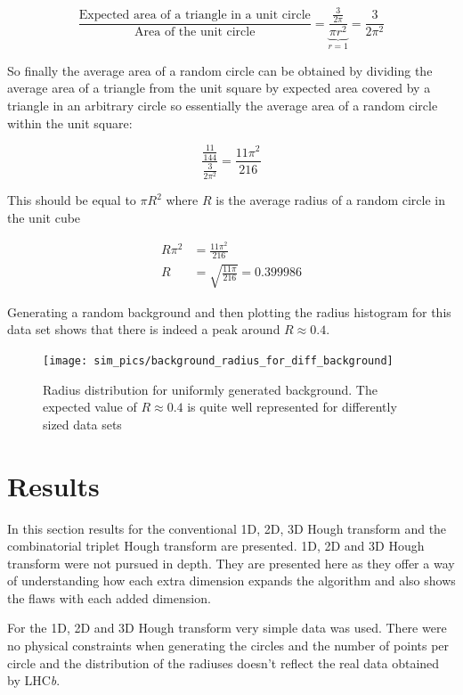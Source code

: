 \documentclass[11pt]{scrreprt}
\begin{document}
\[
\frac{\text{Expected area of a triangle in a unit circle}}{\text{Area of the unit circle}} = \underbrace{\frac{\frac{3}{2\pi}}{\pi r^2}}_{r=1} = \frac{3}{2\pi^2}
\]

So finally the average area of a random circle can be obtained by dividing the average area of a triangle from the unit square by expected
area covered by a triangle in an arbitrary circle so essentially the average area of a random circle within the unit square:

\[
  \frac{\frac{11}{144}}{\frac{3}{2\pi^2}} = \frac{11\pi^2}{216}
\]

This should be equal to $\pi R^2$ where $R$ is the average radius of a random circle in the unit cube

\begin{align}
  R\pi^2 &= \frac{11\pi^2}{216}\nonumber\\
  R &= \sqrt{\frac{11\pi}{216}} = 0.399986\nonumber
\end{align}

Generating a random background and then plotting the radius histogram for this data set shows that there is indeed a peak around
 $R\approx 0.4$.

 \begin{figure}[tb]
   \centering
   \texttt{[image: sim\_pics/background\_radius\_for\_diff\_background]}
   \caption[Radius distribution for background]{Radius distribution for uniformly generated 
    background. The expected value of $R\approx 0.4$
   is quite well represented for differently sized data sets}
   \label{fig:rad_dist}
 \end{figure}

\chapter{Results}
\label{cha:results}
In this section results for the conventional 1D, 2D, 3D Hough transform and 
the combinatorial triplet Hough transform are presented. 1D, 2D and 3D Hough transform
were not pursued in depth. They are presented here as they offer a 
way of understanding how each extra dimension expands the algorithm and also
shows the flaws with each added dimension.

For the 1D, 2D and 3D Hough transform very simple data was used. There were 
no physical constraints when generating the circles and the number of points
per circle and the distribution of the radiuses doesn't reflect the real data obtained
by LHC\textit{b}.
\end{document}
